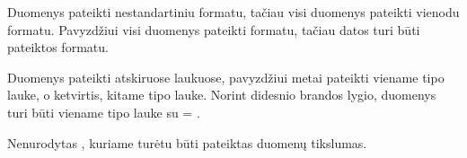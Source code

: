 \documentclass[letterpaper,10pt,lithuanian]{sphinxmanual}
\begin{document}
\begin{fulllineitems}
\begin{sphinxtopic}
\begin{description}
\sphinxAtStartPar
Duomenys pateikti nestandartiniu formatu, tačiau visi duomenys
pateikti vienodu formatu. Pavyzdžiui visi duomenys pateikti
 formatu, tačiau datos turi būti pateiktos 
formatu.

\sphinxAtStartPar
Duomenys pateikti atskiruose laukuose, pavyzdžiui metai pateikti
viename  tipo lauke, o ketvirtis, kitame  tipo
lauke. Norint didesnio brandos lygio, duomenys turi būti viename
 tipo lauke su {\hyperref[\detokenize{dimensijos:property.ref}]{}} = .

\sphinxAtStartPar
Nenurodytas {\hyperref[\detokenize{dimensijos:property.ref}]{}}, kuriame turėtu būti pateiktas
duomenų tikslumas.

\end{description}
\end{sphinxtopic}

\end{fulllineitems}

\end{document}
